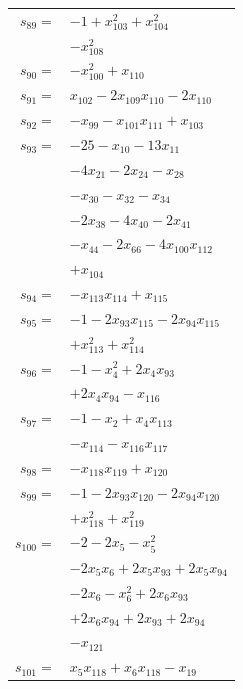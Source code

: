 \begin{longtable}{@{}r@{\;}l@{}}
\(s_{89}=\) & \(\displaystyle -1 +x_{103}^{2} +x_{104}^{2}\) \\
 & \(\displaystyle -x_{108}^{2}\) \\[3pt]
\(s_{90}=\) & \(\displaystyle -x_{100}^{2} +x_{110}\) \\[3pt]
\(s_{91}=\) & \(\displaystyle x_{102} -2x_{109}x_{110} -2x_{110}\) \\[3pt]
\(s_{92}=\) & \(\displaystyle -x_{99} -x_{101}x_{111} +x_{103}\) \\[3pt]
\(s_{93}=\) & \(\displaystyle -25 -x_{10} -13x_{11}\) \\
 & \(\displaystyle -4x_{21} -2x_{24} -x_{28}\) \\
 & \(\displaystyle -x_{30} -x_{32} -x_{34}\) \\
 & \(\displaystyle -2x_{38} -4x_{40} -2x_{41}\) \\
 & \(\displaystyle -x_{44} -2x_{66} -4x_{100}x_{112}\) \\
 & \(\displaystyle +x_{104}\) \\[3pt]
\(s_{94}=\) & \(\displaystyle -x_{113}x_{114} +x_{115}\) \\[3pt]
\(s_{95}=\) & \(\displaystyle -1 -2x_{93}x_{115} -2x_{94}x_{115}\) \\
 & \(\displaystyle +x_{113}^{2} +x_{114}^{2}\) \\[3pt]
\(s_{96}=\) & \(\displaystyle -1 -x_{4}^{2} +2x_{4}x_{93}\) \\
 & \(\displaystyle +2x_{4}x_{94} -x_{116}\) \\[3pt]
\(s_{97}=\) & \(\displaystyle -1 -x_{2} +x_{4}x_{113}\) \\
 & \(\displaystyle -x_{114} -x_{116}x_{117}\) \\[3pt]
\(s_{98}=\) & \(\displaystyle -x_{118}x_{119} +x_{120}\) \\[3pt]
\(s_{99}=\) & \(\displaystyle -1 -2x_{93}x_{120} -2x_{94}x_{120}\) \\
 & \(\displaystyle +x_{118}^{2} +x_{119}^{2}\) \\[3pt]
\(s_{100}=\) & \(\displaystyle -2 -2x_{5} -x_{5}^{2}\) \\
 & \(\displaystyle -2x_{5}x_{6} +2x_{5}x_{93} +2x_{5}x_{94}\) \\
 & \(\displaystyle -2x_{6} -x_{6}^{2} +2x_{6}x_{93}\) \\
 & \(\displaystyle +2x_{6}x_{94} +2x_{93} +2x_{94}\) \\
 & \(\displaystyle -x_{121}\) \\[3pt]
\(s_{101}=\) & \(\displaystyle x_{5}x_{118} +x_{6}x_{118} -x_{19}\) \\

\end{longtable}
